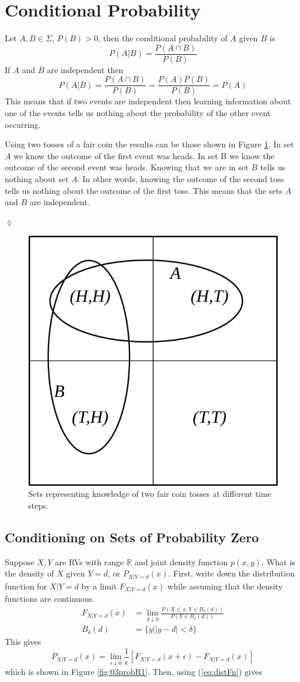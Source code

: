 \section{Conditional Probability}
Let $A,B\in\Sigma$, $P(B)>0$, then the conditional probability of $A$ given $B$ is
$$P(A|B) = \frac{P(A\cap B)}{P(B)}$$
If $A$ and $B$ are independent then
$$P(A|B) = \frac{P(A\cap B)}{P(B)} = \frac{P(A)P(B)}{P(B)} = P(A)$$
This means that if two events are independent then learning information about one of the events tells us nothing about the probability of the other event occurring.

\begin{example}
Using two tosses of a fair coin the results can be those shown in Figure \ref{fig:03coinProb}. In set $A$ we know the outcome of the first event was heads. In set B we know the outcome of the second event was heads. Knowing that we are in set $B$ tells us nothing about set $A$. In other words, knowing the outcome of the second toss tells us nothing about the outcome of the first toss. This means that the sets $A$ and $B$ are independent.
\end{example}
$\lozenge$

\begin{figure}[ht!]
	\centering
	\includegraphics[width=.3\textwidth]{images/03coinProb}
	\caption{Sets representing knowledge of two fair coin tosses at different time steps.}
	\label{fig:03coinProb}
\end{figure}

\subsection{Conditioning on Sets of Probability Zero}
Suppose $X,Y$ are RVs with range $\mathbb{R}$ and joint density function $p(x,y)$. What is the density of $X$ given $Y=d$, or $P_{X|Y=d}(x)$. First, write down the distribution function for $X|Y=d$ by a limit $F_{X|Y=d}(x)$ while assuming that the density functions are continuous.
\begin{align}
\label{eq:distFn}
F_{X|Y=d}(x) &= \lim_{\delta\downarrow 0}\frac{P(X\leq x, Y\in B_\delta(d))}{P(Y\in B_\delta(d))} \\
B_\delta(d) &= \{y | |y-d| < \delta\} \nonumber
\end{align}
This gives
$$P_{X|Y=d}(x) = \lim_{\epsilon\downarrow 0}\frac{1}{\epsilon}[F_{X|Y=d}(x+\epsilon) - F_{X|Y=d}(x)]$$
which is shown in Figure \ref{fig:03probR1}.
Then, using (\ref{eq:distFn}) gives

